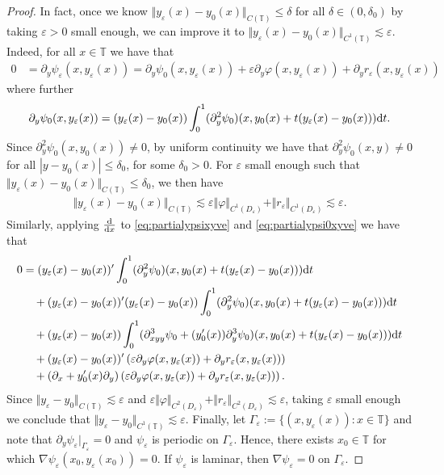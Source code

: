 \documentclass[11pt,reqno]{amsproc}
\newcommand{\ve}{\varepsilon}
\newcommand{\rmd}{{\rm d}}
\numberwithin{equation}{section}
\numberwithin{theorem}{section}
\numberwithin{prop}{section}
\numberwithin{cor}{section}
\numberwithin{lemma}{section}
\theoremstyle{remark}
\theoremstyle{definition}
\begin{document}
\begin{proof}
In fact, once we know $\Vert y_\ve(x) - y_0(x) \Vert_{C(\mathbb{T})}\leq \delta$ for all $\delta\in (0,\delta_0)$ by taking $\ve>0$ small enough, we can improve it to $\Vert y_\ve(x) - y_0(x) \Vert_{C^1(\mathbb{T})}\lesssim \ve$. Indeed, for all $x\in \mathbb{T}$ we have that
\begin{align}\label{eq:partialypsixyve}
0 &= \partial_y\psi_\ve(x,y_\ve(x)) = \partial_y \psi_0(x,y_\ve(x)) + \ve\partial_y\varphi(x,y_\ve(x)) + \partial_y r_\ve(x,y_\ve(x)) 
\end{align}
where further
\begin{align}\label{eq:partialypsi0xyve}
\partial_y \psi_0(x,y_\ve(x)) = (y_\ve(x) - y_0(x) ) \int_0^1 (\partial_y^2\psi_0)(x,y_0(x) + t(y_\ve(x) - y_0(x))) \rmd t.
\end{align}
Since $\partial_y^2\psi_0(x,y_0(x))\neq 0$, by uniform continuity we have that $\partial_y^2\psi_0(x,y)\neq 0$ for all $|y-y_0(x)|\leq \delta_0$, for some $\delta_0>0$. For $\ve$ small enough such that $\Vert y_\ve(x) - y_0(x) \Vert_{C(\mathbb{T})}\leq \delta_0$, we then have
\begin{align*}
\Vert y_\ve(x) - y_0(x) \Vert_{C(\mathbb{T})}\lesssim \ve \Vert \varphi \Vert_{C^1(D_{\ve})} + \Vert r_\ve \Vert_{C^1(D_{\ve})} \lesssim \ve.
\end{align*}
Similarly, applying $\frac{\rmd}{\rmd x}$ to \eqref{eq:partialypsixyve}  and \eqref{eq:partialypsi0xyve} we have that
\begin{align*}
0 &= (y_\ve(x) - y_0(x) )' \int_0^1 (\partial_y^2\psi_0)(x,y_0(x) + t(y_\ve(x) - y_0(x))) \rmd t \\  
&\quad + (y_\ve(x) - y_0(x) )'(y_\ve(x) - y_0(x) ) \int_0^1 (\partial_y^2\psi_0)(x,y_0(x) + t(y_\ve(x) - y_0(x))) \rmd t \\
&\quad + (y_\ve(x) - y_0(x) ) \int_0^1 (\partial_{xyy}^3\psi_0 + (y_0'(x))\partial_y^3\psi_0)(x,y_0(x) + t(y_\ve(x) - y_0(x))) \rmd t \\
&\quad + (y_\ve(x)-y_0(x))' \left( \ve \partial_y\varphi(x,y_\ve(x)) + \partial_y r_\ve(x,y_\ve(x)) \right) \\
&\quad + (\partial_x + y_0'(x)\partial_y)\left(\ve \partial_y\varphi(x,y_\ve(x)) + \partial_y r_\ve(x,y_\ve(x)) \right).
\end{align*}
Since $\Vert y_\ve - y_0 \Vert_{C(\mathbb{T})}\lesssim \ve$ and $\ve \Vert \varphi \Vert_{C^2(D_{\ve})} + \Vert r_\ve \Vert_{C^2(D_{\ve})}\lesssim \ve$, taking $\ve$ small enough we conclude that $\Vert y_\ve - y_0 \Vert_{C^1(\mathbb{T})}\lesssim \ve$. Finally, let $\Gamma_{\ve} := \lbrace (x, y_{\ve}(x)) : x\in \mathbb{T} \rbrace$ and note that $\partial_y\psi_{\ve}|_{\Gamma_{\ve}}=0$ and $\psi_\ve$ is periodic on $\Gamma_{\ve}$. Hence, there exists $x_0\in \mathbb{T}$ for which $\nabla\psi_{\ve}(x_0,y_{\ve}(x_0))=0$. If $\psi_{\ve}$ is laminar, then $\nabla\psi_{\ve}=0$ on $\Gamma_{\ve}$.
\end{proof}
\end{document}
